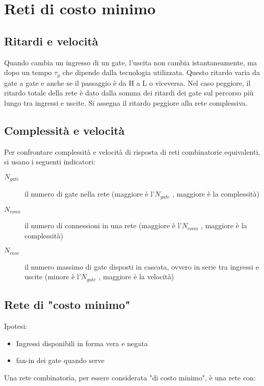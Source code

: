 \documentclass{subfiles}
\begin{document}
\section{Reti di costo minimo}

\subsection{Ritardi e velocità}

Quando cambia un ingresso di un gate, l’uscita non cambia istantaneamente, ma dopo un tempo $\tau_p$ che dipende dalla tecnologia utilizzata.
Questo ritardo varia da gate a gate e anche se il passaggio è da H a L o viceversa.
Nel caso peggiore, il ritardo totale della rete è dato dalla somma dei ritardi dei gate sul percorso più lungo tra ingressi e uscite.
Si assegna il ritardo peggiore alla rete complessiva.

\subsection{Complessità e velocità}

Per confrontare complessità e velocità di risposta di reti combinatorie equivalenti, si usano i seguenti indicatori:

\begin{description}
    \item[$N_{gate}$] il numero di gate nella rete (maggiore è l'$N_{gate}$ , maggiore è la complessità)
    \item[$N_{conn}$] il numero di connessioni in una rete (maggiore è l'$N_{conn}$ , maggiore è la complessità)
    \item[$N_{casc}$] il numero massimo di gate disposti in cascata, ovvero in serie tra ingressi e uscite (minore è l'$N_{gate}$ , maggiore è la velocità)
\end{description}

\subsection{Rete di "costo minimo"}

Ipotesi:

\begin{itemize}
    \item Ingressi disponibili in forma vera e negata
    \item fan-in dei gate quando serve
\end{itemize}

\noindent
Una rete combinatoria, per essere considerata "di costo minimo", è una rete con:
\end{document}
